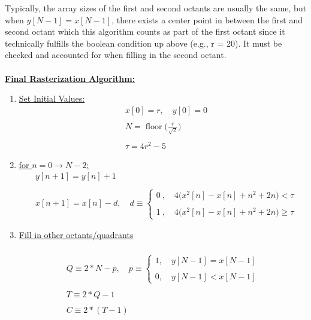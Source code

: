 \documentclass{article}
\DeclareMathOperator{\floor}{floor}
\begin{document}
Typically, the array sizes of the first and second octants are usually the same, but when $y[N - 1] = x[N - 1]$,
there exists a center point in between the first and second octant which this algorithm counts as part of the first
octant since it technically fulfills the boolean condition up above (e.g., r = 20). It must be checked and accounted for when filling
in the second octant. \\ \\

\underline{\textbf{Final Rasterization Algorithm:}} \\
\begin{enumerate}
    \item \underline{Set Initial Values:} 
          \begin{align*}
                &x[0] = r, \quad y[0] = 0 \\ \\
                &N = \floor\Bigg(\frac{r}{\sqrt{2}}\Bigg) \\ \\
                &\tau = 4r^{2} - 5
            \end{align*}
    \item \underline{for $n = 0 \rightarrow N - 2$:} \\
          \begin{align*}
            &y[n + 1] = y[n] + 1 \\ \\
            &x[n + 1] = x[n] - d, \quad d \equiv \begin{cases}
                                                     0 \ , \quad 4\Big(x^{2}[n] - x[n] + n^{2} + 2n\Big) < \tau \\ \\
                                                     1 \ , \quad 4\Big(x^{2}[n] - x[n] + n^{2} + 2n\Big) \geq \tau
                                                   \end{cases}
          \end{align*}
    \item \underline{Fill in other octants/quadrants} \\ \\

          \begin{align*}
                Q \equiv 2*N - p, \quad p \equiv \begin{cases}
                                                     1, \quad y[N - 1] = x[N - 1] \\ \\
                                                     0, \quad y[N - 1] < x[N - 1]
                                                   \end{cases} \\ \\
                T \equiv 2*Q - 1 \\ \\
                C \equiv 2*(T - 1) \\ \\
            \end{align*} 


\end{enumerate}
\end{document}
